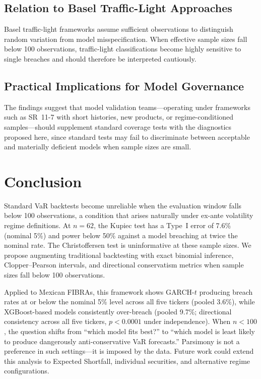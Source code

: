\documentclass[12pt,a4paper]{article}
\begin{document}
\subsection{Relation to Basel Traffic-Light Approaches}

Basel traffic-light frameworks \cite{bcbs2019minimum} assume sufficient observations to distinguish random variation from model misspecification. When effective sample sizes fall below 100 observations, traffic-light classifications become highly sensitive to single breaches and should therefore be interpreted cautiously.

\subsection{Practical Implications for Model Governance}

The findings suggest that model validation teams---operating under frameworks such as SR~11-7 \cite{frb2011sr117} with short histories, new products, or regime-conditioned samples---should supplement standard coverage tests with the diagnostics proposed here, since standard tests may fail to discriminate between acceptable and materially deficient models when sample sizes are small.

\section{Conclusion}

Standard VaR backtests become unreliable when the evaluation window falls below 100 observations, a condition that arises naturally under ex-ante volatility regime definitions. At $n = 62$, the Kupiec test has a Type~I error of 7.6\% (nominal 5\%) and power below 50\% against a model breaching at twice the nominal rate. The Christoffersen test is uninformative at these sample sizes. We propose augmenting traditional backtesting with exact binomial inference, Clopper--Pearson intervals, and directional conservatism metrics when sample sizes fall below 100 observations.

Applied to Mexican FIBRAs, this framework shows GARCH-$t$ producing breach rates at or below the nominal 5\% level across all five tickers (pooled 3.6\%), while XGBoost-based models consistently over-breach (pooled 9.7\%; directional consistency across all five tickers, $p < 0.0001$ under independence). When $n < 100$, the question shifts from ``which model fits best?'' to ``which model is least likely to produce dangerously anti-conservative VaR forecasts.'' Parsimony is not a preference in such settings---it is imposed by the data. Future work could extend this analysis to Expected Shortfall, individual securities, and alternative regime configurations.
\end{document}
